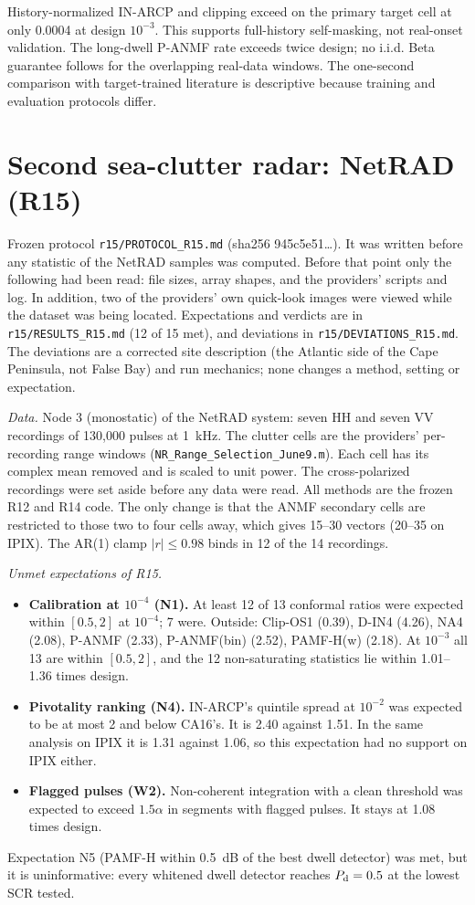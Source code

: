 \documentclass[10pt]{article}
\begin{document}
History-normalized IN-ARCP and clipping exceed on the primary target cell at only 0.0004 at design $10^{-3}$. This supports full-history self-masking, not real-onset validation. The long-dwell P-ANMF rate exceeds twice design; no i.i.d. Beta guarantee follows for the overlapping real-data windows. The one-second comparison with target-trained literature is descriptive because training and evaluation protocols differ.

\section{Second sea-clutter radar: NetRAD (R15)}\label{sup:r15}
Frozen protocol \texttt{r15/PROTOCOL\_R15.md} (sha256 945c5e51\ldots). It was written before any statistic of the NetRAD samples was computed. Before that point only the following had been read: file sizes, array shapes, and the providers' scripts and log. In addition, two of the providers' own quick-look images were viewed while the dataset was being located. Expectations and verdicts are in \texttt{r15/RESULTS\_R15.md} (12 of 15 met), and deviations in \texttt{r15/DEVIATIONS\_R15.md}. The deviations are a corrected site description (the Atlantic side of the Cape Peninsula, not False Bay) and run mechanics; none changes a method, setting or expectation.

\emph{Data.} Node 3 (monostatic) of the NetRAD system: seven HH and seven VV recordings of 130{,}000 pulses at 1~kHz. The clutter cells are the providers' per-recording range windows (\texttt{NR\_Range\_Selection\_June9.m}). Each cell has its complex mean removed and is scaled to unit power. The cross-polarized recordings were set aside before any data were read. All methods are the frozen R12 and R14 code. The only change is that the ANMF secondary cells are restricted to those two to four cells away, which gives 15--30 vectors (20--35 on IPIX). The AR(1) clamp $|r|\le0.98$ binds in 12 of the 14 recordings.

\emph{Unmet expectations of R15.}
\begin{itemize}
\item \textbf{Calibration at $10^{-4}$ (N1).} At least 12 of 13 conformal ratios were expected within $[0.5,2]$ at $10^{-4}$; 7 were. Outside: Clip-OS1 (0.39), D-IN4 (4.26), NA4 (2.08), P-ANMF (2.33), P-ANMF(bin) (2.52), PAMF-H(w) (2.18). At $10^{-3}$ all 13 are within $[0.5,2]$, and the 12 non-saturating statistics lie within 1.01--1.36 times design.
\item \textbf{Pivotality ranking (N4).} IN-ARCP's quintile spread at $10^{-2}$ was expected to be at most 2 and below CA16's. It is 2.40 against 1.51. In the same analysis on IPIX it is 1.31 against 1.06, so this expectation had no support on IPIX either.
\item \textbf{Flagged pulses (W2).} Non-coherent integration with a clean threshold was expected to exceed $1.5\alpha$ in segments with flagged pulses. It stays at 1.08 times design.
\end{itemize}
Expectation N5 (PAMF-H within 0.5~dB of the best dwell detector) was met, but it is uninformative: every whitened dwell detector reaches $P_{\rm d}=0.5$ at the lowest SCR tested.
\end{document}
